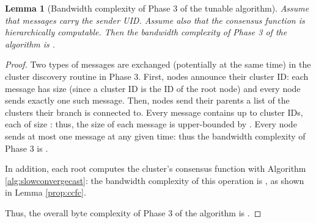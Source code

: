 \documentclass[letterpaper,10pt,conference]{ieeeconf}
\newtheorem{lemma}[theorem]{Lemma}
\begin{document}
\begin{lemma}[Bandwidth complexity of Phase 3 of the tunable algorithm]
\label{lemma:hybrid3ub}
Assume that messages carry the sender UID. Assume also that the consensus function is hierarchically computable. Then the bandwidth complexity of Phase 3 of the algorithm is .
\end{lemma}
\begin{proof}
Two types of messages are exchanged (potentially at the same time) in the cluster discovery routine in Phase 3. First, nodes announce their cluster ID: each message has size  (since a cluster ID is the ID of the root node) and every node sends exactly one such message. Then, nodes send their parents a list of the clusters their branch is connected to. Every message contains up to  cluster IDs, each of size : thus, the size of each message is upper-bounded by . Every node sends at most one message at any given time: thus the bandwidth complexity of Phase 3 is .

In addition, each root computes the cluster's consensus function with Algorithm \ref{alg:slowconvergecast}: the bandwidth complexity of this operation is , as shown in Lemma \ref{prop:ccfc}.

Thus, the overall byte complexity of Phase 3 of the algorithm is .
\end{proof}
\end{document}
